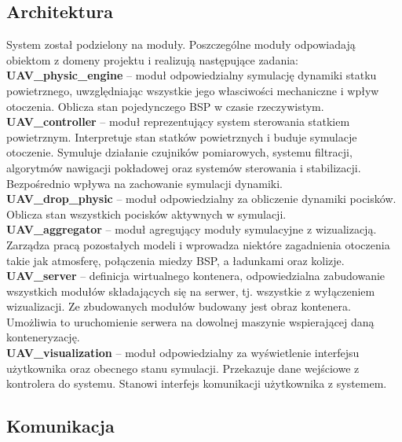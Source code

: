 \documentclass[15pt]{sprawozdanie}
\begin{document}
\subsection{Architektura}

System został podzielony na moduły. Poszczególne moduły odpowiadają obiektom z domeny projektu i realizują następujące zadania:\\

\textbf{UAV\_physic\_engine} -- moduł odpowiedzialny symulację dynamiki statku powietrznego, uwzględniając wszystkie jego własciwości mechaniczne i wpływ otoczenia. Oblicza stan pojedynczego BSP w czasie rzeczywistym. \\

\textbf{UAV\_controller} -- moduł reprezentujący system sterowania statkiem powietrznym. Interpretuje stan statków powietrznych i buduje symulacje otoczenie. Symuluje działanie czujników pomiarowych, systemu filtracji, algorytmów nawigacji pokładowej oraz systemów sterowania i stabilizacji. Bezpośrednio wpływa na zachowanie symulacji dynamiki.\\

\textbf{UAV\_drop\_physic} -- moduł odpowiedzialny za obliczenie dynamiki pocisków. Oblicza stan wszystkich pocisków aktywnych w symulacji.\\

\textbf{UAV\_aggregator} -- moduł agregujący moduły symulacyjne z wizualizacją. Zarządza pracą pozostałych modeli i wprowadza niektóre zagadnienia otoczenia takie jak atmosferę, połączenia miedzy BSP, a ładunkami oraz kolizje.\\

\textbf{UAV\_server} -- definicja wirtualnego kontenera, odpowiedzialna zabudowanie wszystkich modułów składających się na serwer, tj. wszystkie z wyłączeniem wizualizacji. Ze zbudowanych modułów budowany jest obraz kontenera. Umożliwia to uruchomienie serwera na dowolnej maszynie wspierającej daną konteneryzację.\\

\textbf{UAV\_visualization} -- moduł odpowiedzialny za wyświetlenie  interfejsu użytkownika oraz obecnego stanu symulacji. Przekazuje dane wejściowe z kontrolera do systemu. Stanowi interfejs komunikacji użytkownika z systemem. \\


\newpage

\subsection{Komunikacja}
\end{document}
